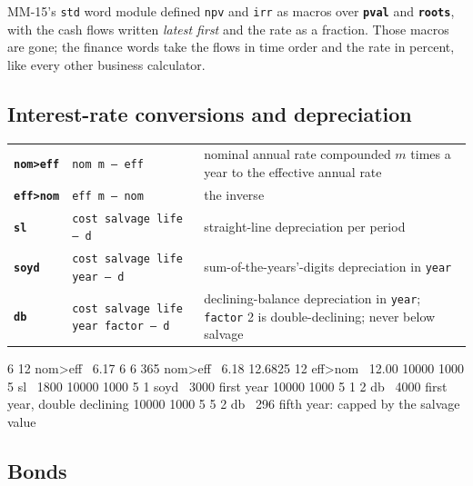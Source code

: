 \documentclass[11pt,letterpaper]{article}
\newcommand{\code}[1]{\texttt{#1}}
\newcommand{\cmd}[1]{\texttt{\textbf{#1}}}
\newcommand{\stk}[1]{\texttt{#1}}
\newenvironment{note}{\begin{tcolorbox}[colback=codebg,colframe=rule,boxrule=0.4pt,arc=1pt,left=6pt,right=6pt,top=4pt,bottom=4pt]}{\end{tcolorbox}}
\begin{document}
\begin{note}
MM-15's \code{std} word module defined \code{npv} and \code{irr} as macros over \cmd{pval} and \cmd{roots}, with the cash flows written \emph{latest first} and the rate as a fraction. Those macros are gone; the finance words take the flows in time order and the rate in percent, like every other business calculator.
\end{note}

\subsection{Interest-rate conversions and depreciation}

\begin{center}
\begin{tabular}{@{}l>{\raggedright\arraybackslash}p{}>{\raggedright\arraybackslash}p{}@{}}
\toprule
\cmd{nom>eff} & \stk{nom m -- eff} & nominal annual rate compounded $m$ times a year to the effective annual rate \\
\cmd{eff>nom} & \stk{eff m -- nom} & the inverse \\
\cmd{sl}   & \stk{cost salvage life -- d} & straight-line depreciation per period \\
\cmd{soyd} & \stk{cost salvage life year -- d} & sum-of-the-years'-digits depreciation in \code{year} \\
\cmd{db}   & \stk{cost salvage life year factor -- d} & declining-balance depreciation in \code{year}; \code{factor} 2 is double-declining; never below salvage \\
\bottomrule
\end{tabular}
\end{center}
\begin{rpn}
6 12 nom>eff            \ 6.17   6%
6 365 nom>eff           \ 6.18
12.6825 12 eff>nom      \ 12.00
10000 1000 5 sl         \ 1800
10000 1000 5 1 soyd     \ 3000   first year
10000 1000 5 1 2 db     \ 4000   first year, double declining
10000 1000 5 5 2 db     \ 296    fifth year: capped by the salvage value
\end{rpn}

\subsection{Bonds}
\end{document}
